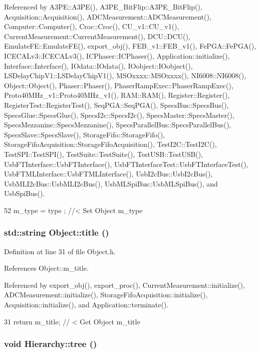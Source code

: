 Referenced by A3PE::A3PE(), A3PE\_\-BitFlip::A3PE\_\-BitFlip(), Acquisition::Acquisition(), ADCMeasurement::ADCMeasurement(), Computer::Computer(), Croc::Croc(), CU\_\-v1::CU\_\-v1(), CurrentMeasurement::CurrentMeasurement(), DCU::DCU(), EmulateFE::EmulateFE(), export\_\-obj(), FEB\_\-v1::FEB\_\-v1(), FePGA::FePGA(), ICECALv3::ICECALv3(), ICPhaser::ICPhaser(), Application::initialize(), Interface::Interface(), IOdata::IOdata(), IOobject::IOobject(), LSDelayChipV1::LSDelayChipV1(), MSOxxxx::MSOxxxx(), NI6008::NI6008(), Object::Object(), Phaser::Phaser(), PhaserRampExec::PhaserRampExec(), Proto40MHz\_\-v1::Proto40MHz\_\-v1(), RAM::RAM(), Register::Register(), RegisterTest::RegisterTest(), SeqPGA::SeqPGA(), SpecsBus::SpecsBus(), SpecsGlue::SpecsGlue(), SpecsI2c::SpecsI2c(), SpecsMaster::SpecsMaster(), SpecsMezzanine::SpecsMezzanine(), SpecsParallelBus::SpecsParallelBus(), SpecsSlave::SpecsSlave(), StorageFifo::StorageFifo(), StorageFifoAcquisition::StorageFifoAcquisition(), TestI2C::TestI2C(), TestSPI::TestSPI(), TestSuite::TestSuite(), TestUSB::TestUSB(), UsbFTInterface::UsbFTInterface(), UsbFTInterfaceTest::UsbFTInterfaceTest(), UsbFTMLInterface::UsbFTMLInterface(), UsbI2cBus::UsbI2cBus(), UsbMLI2cBus::UsbMLI2cBus(), UsbMLSpiBus::UsbMLSpiBus(), and UsbSpiBus().


\begin{DoxyCode}
52 { m_type  = type  ; } //< Set Object m_type
\end{DoxyCode}
\hypertarget{classObject_a73a0f1a41828fdd8303dd662446fb6c3}{
\subsubsection[{title}]{\setlength{\rightskip}{0pt plus 5cm}std::string Object::title ()}}
\label{classObject_a73a0f1a41828fdd8303dd662446fb6c3}


Definition at line 31 of file Object.h.

References Object::m\_\-title.

Referenced by export\_\-obj(), export\_\-proc(), CurrentMeasurement::initialize(), ADCMeasurement::initialize(), StorageFifoAcquisition::initialize(), Acquisition::initialize(), and Application::terminate().


\begin{DoxyCode}
31 { return m_title;      } // < Get Object m_title
\end{DoxyCode}
\hypertarget{classHierarchy_a594c294c5f60c230e106d522ed008212}{
\subsubsection[{tree}]{\setlength{\rightskip}{0pt plus 5cm}void Hierarchy::tree ()}}
\label{classHierarchy_a594c294c5f60c230e106d522ed008212}


